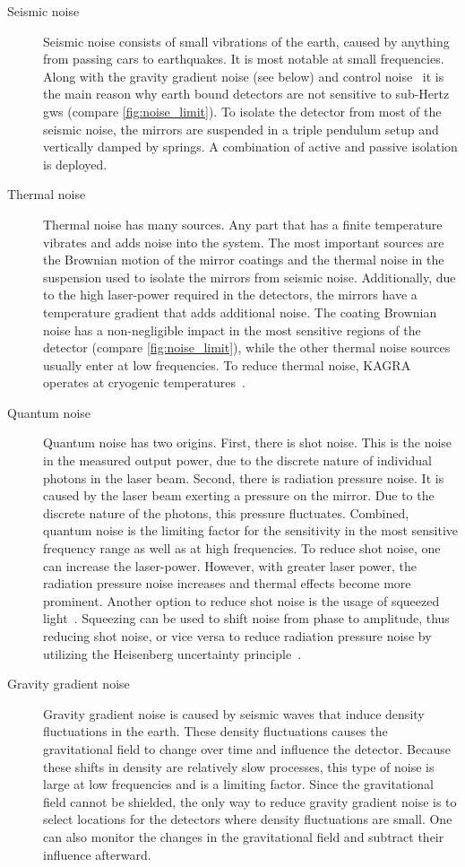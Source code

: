 \begin{description}
 \item[Seismic noise] Seismic noise consists of small vibrations of the earth, caused by anything from passing cars to earthquakes. It is most notable at small frequencies. Along with the gravity gradient noise (see below) and control noise~\cite{Dooley:2013jqa, aLIGO:2020wna} it is the main reason why earth bound detectors are not sensitive to sub-Hertz \acrshort{gw}s (compare \autoref{fig:noise_limit}). To isolate the detector from most of the seismic noise, the mirrors are suspended in a triple pendulum setup and vertically damped by springs. A combination of active and passive isolation is deployed.
 \item[Thermal noise] Thermal noise has many sources. Any part that has a finite temperature vibrates and adds noise into the system. The most important sources are the Brownian motion of the mirror coatings and the thermal noise in the suspension used to isolate the mirrors from seismic noise. Additionally, due to the high laser-power required in the detectors, the mirrors have a temperature gradient that adds additional noise. The coating Brownian noise has a non-negligible impact in the most sensitive regions of the detector (compare \autoref{fig:noise_limit}), while the other thermal noise sources usually enter at low frequencies. To reduce thermal noise, KAGRA operates at cryogenic temperatures~\cite{KAGRA:2018plz}.
 \item[Quantum noise] Quantum noise has two origins. First, there is shot noise. This is the noise in the measured output power, due to the discrete nature of individual photons in the laser beam. Second, there is radiation pressure noise. It is caused by the laser beam exerting a pressure on the mirror. Due to the discrete nature of the photons, this pressure fluctuates. Combined, quantum noise is the limiting factor for the sensitivity in the most sensitive frequency range as well as at high frequencies. To reduce shot noise, one can increase the laser-power. However, with greater laser power, the radiation pressure noise increases and thermal effects become more prominent. Another option to reduce shot noise is the usage of squeezed light~\cite{Caves:1981hw, LIGOScientific:2013pcc, Lough:2020xft}. Squeezing can be used to shift noise from phase to amplitude, thus reducing shot noise, or vice versa to reduce radiation pressure noise by utilizing the Heisenberg uncertainty principle~\cite{Heurs:2018wsu}.
 \item[Gravity gradient noise] Gravity gradient noise is caused by seismic waves that induce density fluctuations in the earth. These density fluctuations causes the gravitational field to change over time and influence the detector. Because these shifts in density are relatively slow processes, this type of noise is large at low frequencies and is a limiting factor. Since the gravitational field cannot be shielded, the only way to reduce gravity gradient noise is to select locations for the detectors where density fluctuations are small. One can also monitor the changes in the gravitational field and subtract their influence afterward.
\end{description}

